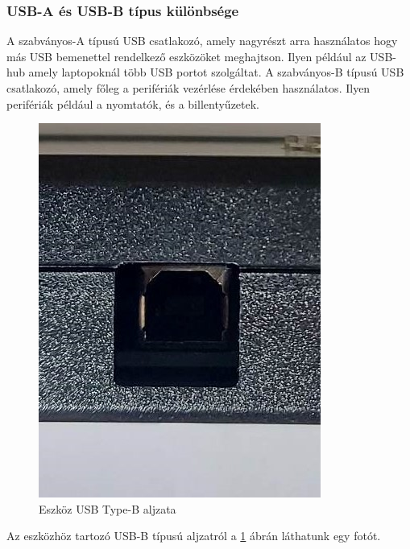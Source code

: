 \documentclass[tocnopagenum]{thesis-ekf}
\theoremstyle{definition}
\theoremstyle{remark}
\begin{document}
	\subsubsection{USB-A és USB-B típus különbsége}
	A szabványos-A típusú USB csatlakozó, amely nagyrészt arra használatos hogy más USB bemenettel rendelkező eszközöket meghajtson. Ilyen például az USB-hub amely laptopoknál több USB portot szolgáltat.
	A szabványos-B típusú USB csatlakozó, amely főleg a perifériák vezérlése érdekében használatos. Ilyen perifériák például a nyomtatók, és a billentyűzetek. \cite{typeab}
	\\

	\begin{figure}[H]	
		\centering
		\includegraphics[scale=0.6]{lampa_usb2}
		\caption[Eszközök bemeneti portjai]{Eszköz USB Type-B aljzata}
		\label{fig:usb2_csatl}
	\end{figure}
	Az eszközhöz tartozó USB-B típusú aljzatról a \ref{fig:usb2_csatl} ábrán láthatunk egy fotót.
\newpage
\end{document}
